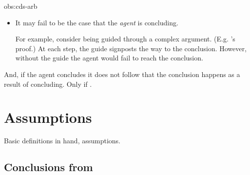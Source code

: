 \begin{note}
\begin{motivation}{obs:cds-arb}
\begin{itemize}
      For example, there are exactly five intermediate logics that have the interpolation property (\cite[cf.][]{Maksimova:1977un}).
      However, \citeauthor{Maksimova:1977un} may have been ready to give up on the proof at any point.%
      \footnote{%
        Though, admittedly, it is unlikely \citeauthor{Maksimova:1977un} would have given up.
      }
    \item
      It may fail to be the case that the \emph{agent} is concluding.

      For example, consider being guided through a complex argument.
      (E.g. \citeauthor{Maksimova:1977un}'s proof.)
      At each step, the guide signposts the way to the conclusion.
      However, without the guide the agent would fail to reach the conclusion.
    \end{itemize}
    \vspace{-\baselineskip}
  \end{motivation}
\end{note}


\begin{note}
  \color{red}
  And, if the agent concludes it does not follow that the conclusion happens as a result of concluding.
  Only if .
\end{note}



\section{Assumptions}
\label{sec:assumptions}

\begin{note}
  Basic definitions in hand, assumptions.
\end{note}

\subsection{Conclusions from }
\label{sec:pools-premises}

